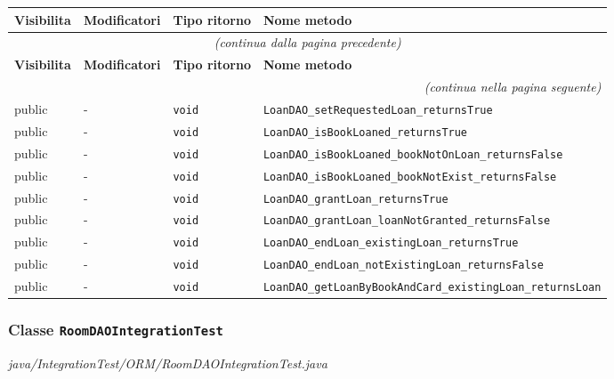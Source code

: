 \begin{longtable}{@{}llll@{}}
\toprule
\textbf{Visibilita} & \textbf{Modificatori} & \textbf{Tipo ritorno} & \textbf{Nome metodo} \\
\midrule
\endfirsthead
\multicolumn{4}{c}{\small\itshape (continua dalla pagina precedente)} \\
\toprule
\textbf{Visibilita} & \textbf{Modificatori} & \textbf{Tipo ritorno} & \textbf{Nome metodo} \\
\midrule
\endhead
\midrule
\multicolumn{4}{r}{\small\itshape (continua nella pagina seguente)} \\
\endfoot
\bottomrule
\endlastfoot
  public & - & \texttt{void} & \texttt{LoanDAO\_setRequestedLoan\_returnsTrue} \\
  public & - & \texttt{void} & \texttt{LoanDAO\_isBookLoaned\_returnsTrue} \\
  public & - & \texttt{void} & \texttt{LoanDAO\_isBookLoaned\_bookNotOnLoan\_returnsFalse} \\
  public & - & \texttt{void} & \texttt{LoanDAO\_isBookLoaned\_bookNotExist\_returnsFalse} \\
  public & - & \texttt{void} & \texttt{LoanDAO\_grantLoan\_returnsTrue} \\
  public & - & \texttt{void} & \texttt{LoanDAO\_grantLoan\_loanNotGranted\_returnsFalse} \\
  public & - & \texttt{void} & \texttt{LoanDAO\_endLoan\_existingLoan\_returnsTrue} \\
  public & - & \texttt{void} & \texttt{LoanDAO\_endLoan\_notExistingLoan\_returnsFalse} \\
  public & - & \texttt{void} & \texttt{LoanDAO\_getLoanByBookAndCard\_existingLoan\_returnsLoan} \\
\end{longtable}

\subsubsection*{Classe \texttt{RoomDAOIntegrationTest}}\label{RoomDAOIntegrationTest}
{\small\textit{java/IntegrationTest/ORM/RoomDAOIntegrationTest.java}}
\vspace{4pt}

